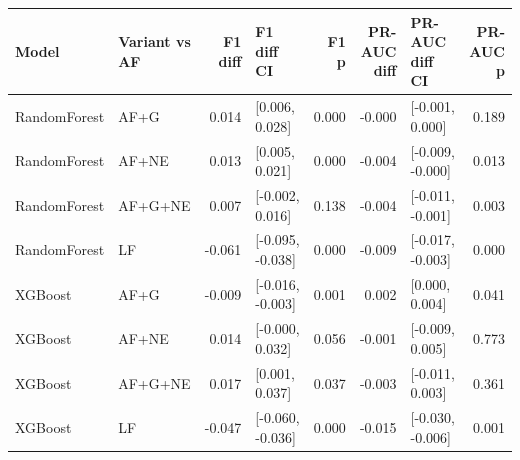 \begin{tabular}{llrlrrlr}
\toprule
Model & Variant vs AF & F1 diff & F1 diff CI & F1 p & PR-AUC diff & PR-AUC diff CI & PR-AUC p \\
\midrule
RandomForest & AF+G & 0.014 & [0.006, 0.028] & 0.000 & -0.000 & [-0.001, 0.000] & 0.189 \\
RandomForest & AF+NE & 0.013 & [0.005, 0.021] & 0.000 & -0.004 & [-0.009, -0.000] & 0.013 \\
RandomForest & AF+G+NE & 0.007 & [-0.002, 0.016] & 0.138 & -0.004 & [-0.011, -0.001] & 0.003 \\
RandomForest & LF & -0.061 & [-0.095, -0.038] & 0.000 & -0.009 & [-0.017, -0.003] & 0.000 \\
XGBoost & AF+G & -0.009 & [-0.016, -0.003] & 0.001 & 0.002 & [0.000, 0.004] & 0.041 \\
XGBoost & AF+NE & 0.014 & [-0.000, 0.032] & 0.056 & -0.001 & [-0.009, 0.005] & 0.773 \\
XGBoost & AF+G+NE & 0.017 & [0.001, 0.037] & 0.037 & -0.003 & [-0.011, 0.003] & 0.361 \\
XGBoost & LF & -0.047 & [-0.060, -0.036] & 0.000 & -0.015 & [-0.030, -0.006] & 0.001 \\
\bottomrule
\end{tabular}
